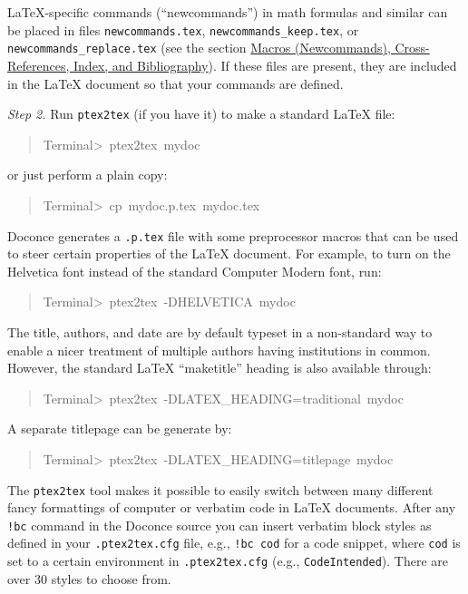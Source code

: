 \documentclass[a4paper]{article}
\begin{document}
LaTeX-specific commands (``newcommands'') in math formulas and similar
can be placed in files \texttt{newcommands.tex}, \texttt{newcommands\_keep.tex}, or
\texttt{newcommands\_replace.tex} (see the section \hyperref[macros-newcommands-cross-references-index-and-bibliography]{Macros (Newcommands), Cross-References, Index, and Bibliography}).
If these files are present, they are included in the LaTeX document
so that your commands are defined.

\emph{Step 2.} Run \texttt{ptex2tex} (if you have it) to make a standard LaTeX file:
%
\begin{quote}{\ttfamily \raggedright \noindent
Terminal>~ptex2tex~mydoc
}
\end{quote}

or just perform a plain copy:
%
\begin{quote}{\ttfamily \raggedright \noindent
Terminal>~cp~mydoc.p.tex~mydoc.tex
}
\end{quote}

Doconce generates a \texttt{.p.tex} file with some preprocessor macros
that can be used to steer certain properties of the LaTeX document.
For example, to turn on the Helvetica font instead of the standard
Computer Modern font, run:
%
\begin{quote}{\ttfamily \raggedright \noindent
Terminal>~ptex2tex~-DHELVETICA~mydoc
}
\end{quote}

The title, authors, and date are by default typeset in a non-standard
way to enable a nicer treatment of multiple authors having
institutions in common. However, the standard LaTeX ``maketitle'' heading
is also available through:
%
\begin{quote}{\ttfamily \raggedright \noindent
Terminal>~ptex2tex~-DLATEX\_HEADING=traditional~mydoc
}
\end{quote}

A separate titlepage can be generate by:
%
\begin{quote}{\ttfamily \raggedright \noindent
Terminal>~ptex2tex~-DLATEX\_HEADING=titlepage~mydoc
}
\end{quote}

The \texttt{ptex2tex} tool makes it possible to easily switch between many
different fancy formattings of computer or verbatim code in LaTeX
documents. After any \texttt{!bc} command in the Doconce source you can
insert verbatim block styles as defined in your \texttt{.ptex2tex.cfg}
file, e.g., \texttt{!bc cod} for a code snippet, where \texttt{cod} is set to
a certain environment in \texttt{.ptex2tex.cfg} (e.g., \texttt{CodeIntended}).
There are over 30 styles to choose from.
\end{document}
